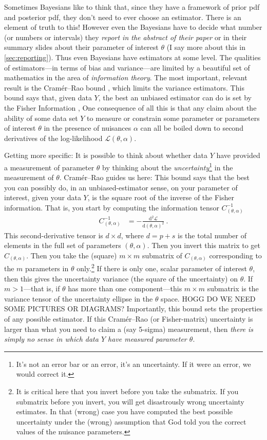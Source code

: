 \documentclass{article}
\newcommand{\dd}{\mathrm{d}}
\begin{document}
Sometimes Bayesians like to think that, since they have a framework of prior pdf and posterior pdf, they don't need to ever choose an estimator.
There is an element of truth to this!
However even the Bayesians have to decide what number (or numbers or intervals) they \emph{report in the abstract of their paper} or in their summary slides about their parameter of interest $\theta$ (I say more about this in \ref{sec:reporting}).
Thus even Bayesians have estimators at some level.
The qualities of estimators---in terms of bias and variance---are limited by a beautiful set of mathematics in the area of \emph{information theory}.
The most important, relevant result is the Cram\'er--Rao bound \cite{cramer, rao}, which limits the variance estimators.
This bound says that, given data $Y$, the best an unbiased estimator can do is set by the Fisher Information \cite{fisher},
One consequence of all this is that any claim about the ability of some data set $Y$ to measure or constrain some parameter or parameters of interest $\theta$ in the presence of nuisances $\alpha$ can all be boiled down to second derivatives of the log-likelihood $\mathscr{L}(\theta,\alpha)$.

Getting more specific:
It is possible to think about whether data $Y$ have provided a measurement of parameter $\theta$ by thinking about the \emph{uncertainty}\footnote{%
It's not an error bar or an error, it's an uncertainty. If it were an error, we would correct it.}
in the measurement of $\theta$.
Cram\'er--Rao guides us here:
This bound says that the best you can possibly do, in an unbiased-estimator sense, on your parameter of interest, given your data $Y$, is the square root of the inverse of the Fisher information.
That is, you start by computing the information tensor $C^{-1}_{(\theta,\alpha)}$
\begin{align}
    C^{-1}_{(\theta,\alpha)} &= - \frac{\dd^2\mathscr{L}}{\dd(\theta,\alpha)^2} ~.\label{eq:fisher}
\end{align}
This second-derivative tensor is $d\times d$, where $d=p+s$ is the total number of elements in the full set of parameters $(\theta,\alpha)$.
Then you invert this matrix to get $C_{(\theta,\alpha)}$.
Then you take the (square) $m\times m$ submatrix of $C_{(\theta,\alpha)}$ corresponding to the $m$ parameters in $\theta$ only.\footnote{It is critical here that you invert before you take the submatrix. If you submatrix before you invert, you will get disastrously wrong uncertainty estimates. In that (wrong) case you have computed the best possible uncertainty under the (wrong) assumption that God told you the correct values of the nuisance parameters.}
If there is only one, scalar parameter of interest $\theta$, then this gives the uncertainty variance (the square of the uncertainty) on $\theta$.
If $m>1$---that is, if $\theta$ has more than one component---this $m\times m$ submatrix is the variance tensor of the uncertainty ellipse in the $\theta$ space.
HOGG DO WE NEED SOME PICTURES OR DIAGRAMS?
Importantly, this bound sets the properties of any possible estimator.
If this Cram\'er--Rao (or Fisher-matrix) uncertainty is larger than what you need to claim a (say 5-sigma) measurement, then \emph{there is simply no sense in which data $Y$ have measured parameter $\theta$}.
\end{document}
